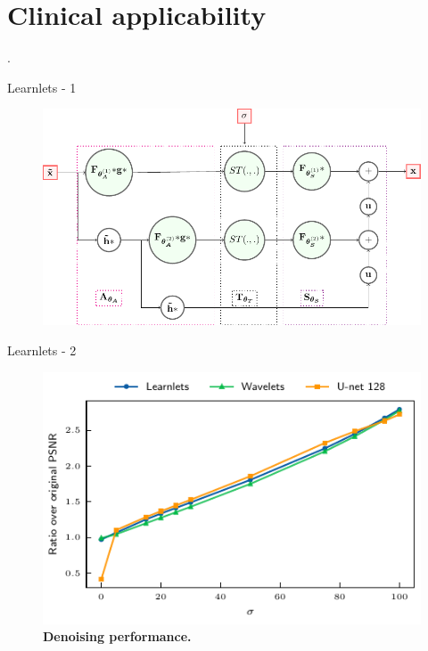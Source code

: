 \section{Clinical applicability}

\begin{frame}[plain,c]

    \begin{center}
        \color{DarkBlue}
    \Huge \thesection. \insertsection
    \end{center}

\end{frame}


\begin{frame}{Learnlets - 1}
    \begin{figure}
        \centering
        \includegraphics[height=0.8\textheight]{Figures/clinic_applic/learnlets_tikz_reduced.pdf}
    \end{figure}
\end{frame}

\begin{frame}{Learnlets - 2}
    \begin{figure}[ht]
        \includegraphics[height=0.78\textheight]{Figures/clinic_applic/model_comparison.pdf}
        \caption{\textbf{Denoising performance.}}
        \end{figure}
\end{frame}


